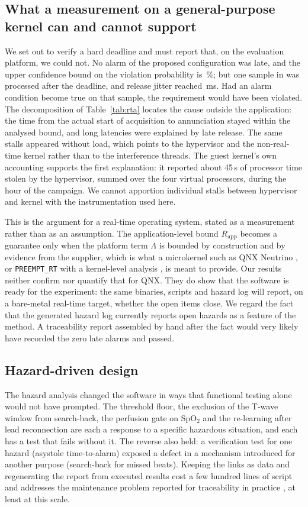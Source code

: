 \subsection{What a measurement on a general-purpose kernel can and cannot support}
We set out to verify a hard deadline and must report that, on the evaluation platform, we could not. No alarm of the proposed configuration was late, and the upper confidence bound on the violation probability is \NFpEvStrUB\,\%; but one sample in \NFpEvStrNSamp{} was processed after the deadline, and release jitter reached \NFpEvStrJitMaxMs\,ms. Had an alarm condition become true on that sample, the requirement would have been violated. The decomposition of Table~\ref{tab:rta} locates the cause outside the application: the time from the actual start of acquisition to annunciation stayed within the analysed bound, and long latencies were explained by late release. The same stalls appeared without load, which points to the hypervisor and the non-real-time kernel rather than to the interference threads. The guest kernel's own accounting supports the first explanation: it reported about 45\,s of processor time stolen by the hypervisor, summed over the four virtual processors, during the hour of the campaign. We cannot apportion individual stalls between hypervisor and kernel with the instrumentation used here.

This is the argument for a real-time operating system, stated as a measurement rather than as an assumption. The application-level bound $R_{\mathrm{app}}$ becomes a guarantee only when the platform term $\Lambda$ is bounded by construction and by evidence from the supplier, which is what a microkernel such as QNX Neutrino \cite{hildebrand1992}, or \texttt{PREEMPT\_RT} with a kernel-level analysis \cite{bristot2020}, is meant to provide. Our results neither confirm nor quantify that for QNX. They do show that the software is ready for the experiment: the same binaries, scripts and hazard log will report, on a bare-metal real-time target, whether the open items close. We regard the fact that the generated hazard log currently reports \NHazOpen{} open hazards as a feature of the method. A traceability report assembled by hand after the fact would very likely have recorded the zero late alarms and passed.

\subsection{Hazard-driven design}
The hazard analysis changed the software in ways that functional testing alone would not have prompted. The threshold floor, the exclusion of the T-wave window from search-back, the perfusion gate on SpO$_2$ and the re-learning after lead reconnection are each a response to a specific hazardous situation, and each has a test that fails without it. The reverse also held: a verification test for one hazard (asystole time-to-alarm) exposed a defect in a mechanism introduced for another purpose (search-back for missed beats). Keeping the links as data and regenerating the report from executed results cost a few hundred lines of script and addresses the maintenance problem reported for traceability in practice \cite{regan2013}, at least at this scale.

